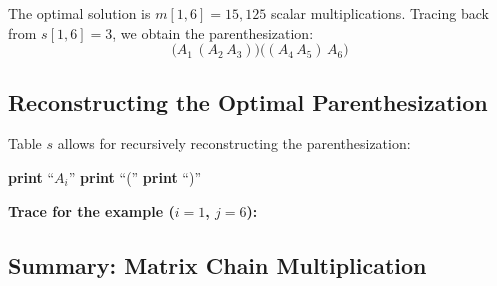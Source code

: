 The optimal solution is $m[1,6] = 15,125$ scalar multiplications.
Tracing back from $s[1,6] = 3$, we obtain the parenthesization:
\[
  \bigl(A_1 \,(A_2\,A_3)\bigr)\bigl((A_4\,A_5)\,A_6\bigr)
\]

\subsection{Reconstructing the Optimal Parenthesization}

Table $s$ allows for recursively reconstructing the parenthesization:

\begin{algorithm}[H]
\caption{Print-Optimal-Parens($s$, $i$, $j$)}
\begin{algorithmic}[1]
    \State \textbf{print} ``$A_i$''
\Else
    \State \textbf{print} ``(''
    \State {}
    \State {}
    \State \textbf{print} ``)''
\EndIf
\end{algorithmic}
\end{algorithm}

\textbf{Trace for the example ($i=1$, $j=6$):}

\begin{center}
\end{center}

\subsection{Summary: Matrix Chain Multiplication}

